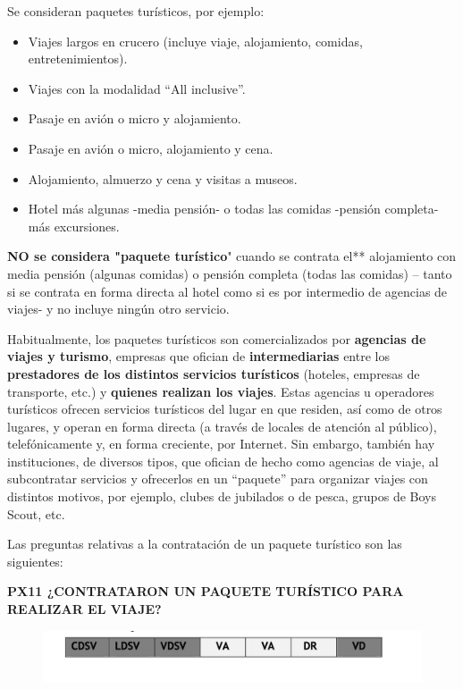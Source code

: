 \documentclass[
  openany]{book}
\begin{document}
Se consideran paquetes turísticos, por ejemplo:

\begin{itemize}
\item
  Viajes largos en crucero (incluye viaje, alojamiento, comidas, entretenimientos).
\item
  Viajes con la modalidad ``All inclusive''.
\item
  Pasaje en avión o micro y alojamiento.
\item
  Pasaje en avión o micro, alojamiento y cena.
\item
  Alojamiento, almuerzo y cena y visitas a museos.
\item
  Hotel más algunas -media pensión- o todas las comidas -pensión completa- más excursiones.
\end{itemize}

\textbf{NO se considera "paquete turístico}" cuando se contrata el** alojamiento con media pensión (algunas comidas) o pensión completa (todas las comidas) -- tanto si se contrata en forma directa al hotel como si es por intermedio de agencias de viajes- y no incluye ningún otro servicio.

Habitualmente, los paquetes turísticos son comercializados por \textbf{agencias de viajes y turismo}, empresas que ofician de \textbf{intermediarias} entre los \textbf{prestadores de los distintos servicios turísticos} (hoteles, empresas de transporte, etc.) y \textbf{quienes realizan los viajes}. Estas agencias u operadores turísticos ofrecen servicios turísticos del lugar en que residen, así como de otros lugares, y operan en forma directa (a través de locales de atención al público), telefónicamente y, en forma creciente, por Internet. Sin embargo, también hay instituciones, de diversos tipos, que ofician de hecho como agencias de viaje, al subcontratar servicios y ofrecerlos en un ``paquete'' para organizar viajes con distintos motivos, por ejemplo, clubes de jubilados o de pesca, grupos de Boys Scout, etc.

Las preguntas relativas a la contratación de un paquete turístico son las siguientes:

\textbf{PX11 ¿CONTRATARON UN PAQUETE TURÍSTICO PARA REALIZAR EL VIAJE?}

\begin{figure}

{\centering \includegraphics[width=1\linewidth]{imagenes/figura6-102} 

}

\end{figure}
\end{document}
